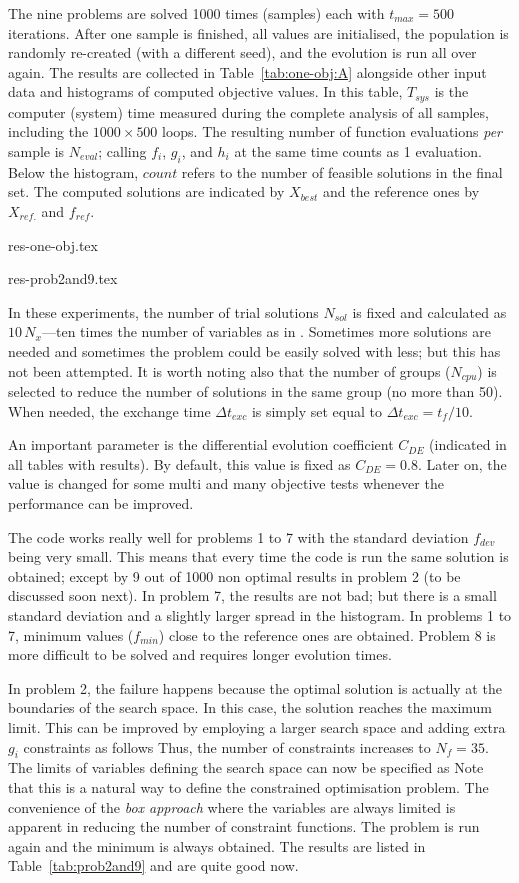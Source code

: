 \documentclass[final,5p,times,twocolumn]{elsarticle}
\begin{document}
The nine problems are solved 1000 times (samples) each with ${t_{max}=500}$ iterations. After one
sample is finished, all values are initialised, the population is randomly re-created (with a
different seed), and the evolution is run all over again. The results are collected in
Table~\ref{tab:one-obj:A} alongside other input data and histograms of computed objective values. In
this table, $T_{sys}$ is the computer (system) time measured during the complete analysis of all
samples, including the $1000 \times 500$ loops. The resulting number of function evaluations
\emph{per} sample is $N_{eval}$; calling $f_i$, $g_i$, and $h_i$ at the same time counts as 1
evaluation. Below the histogram, $count$ refers to the number of feasible solutions in the final
set. The computed solutions are indicated by $X_{best}$ and the reference ones by $X_{ref.}$ and
$f_{ref}$. 


{res-one-obj.tex}

{res-prob2and9.tex}


In these experiments, the number of trial solutions $N_{sol}$ is fixed and calculated as
${10\,N_x}$---ten times the number of variables as in \citep{deb:00}. Sometimes more solutions are
needed and sometimes the problem could be easily solved with less; but this has not been attempted.
It is worth noting also that the number of groups ($N_{cpu}$) is selected to reduce the number of
solutions in the same group (no more than 50). When needed, the exchange time $\Delta t_{exc}$ is
simply set equal to $\Delta t_{exc} = t_f / 10$.

An important parameter is the differential evolution coefficient $C_{DE}$ (indicated in all tables
with results). By default, this value is fixed as ${C_{DE}=0.8}$. Later on, the value is changed for
some multi and many objective tests whenever the performance can be improved.

The code works really well for problems 1 to 7 with the standard deviation $f_{dev}$ being very
small. This means that every time the code is run the same solution is obtained; except by 9 out of
1000 non optimal results in problem 2 (to be discussed soon next). In problem 7, the results are not
bad; but there is a small standard deviation and a slightly larger spread in the histogram. In
problems 1 to 7, minimum values ($f_{min}$) close to the reference ones are obtained. Problem 8 is
more difficult to be solved and requires longer evolution times. 

In problem 2, the failure happens because the optimal solution is actually at the boundaries of the
search space. In this case, the solution reaches the maximum limit. This can be improved by
employing a larger search space and adding extra $g_i$ constraints as follows
\OptmProbTwoFix
Thus, the number of constraints increases to $N_f=35$. The limits of variables defining the
search space can now be specified as
\OptmProbTwoXfix
Note that this is a natural way to define the constrained optimisation problem. The convenience of
the \emph{box approach} where the variables are always limited is apparent in reducing the number of
constraint functions. The problem is run again and the minimum is always obtained. The results are
listed in Table~\ref{tab:prob2and9} and are quite good now.
\end{document}
